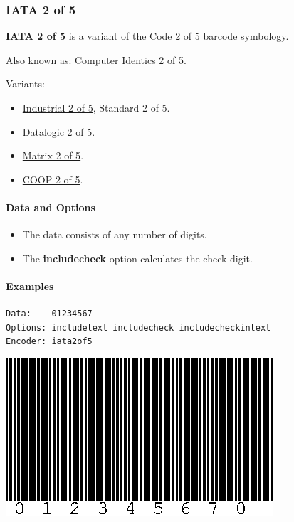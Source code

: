 \hypertarget{iata-2-of-5}{%
\subsubsection{IATA 2 of 5}\label{iata-2-of-5}}

\textbf{IATA 2 of 5} is a variant of the
\protect\hyperlink{code-25}{Code 2 of 5} barcode symbology.

Also known as: Computer Identics 2 of 5.

Variants:

\begin{itemize}
\tightlist
\item
  \protect\hyperlink{code-25}{Industrial 2 of 5}, Standard 2 of 5.
\item
  \protect\hyperlink{datalogic-2-of-5}{Datalogic 2 of 5}.
\item
  \protect\hyperlink{matrix-2-of-5}{Matrix 2 of 5}.
\item
  \protect\hyperlink{coop-2-of-5}{COOP 2 of 5}.
\end{itemize}

\hypertarget{data-and-options-68}{%
\paragraph{Data and Options}\label{data-and-options-68}}

\begin{itemize}
\tightlist
\item
  The data consists of any number of digits.
\item
  The \textbf{includecheck} option calculates the check digit.
\end{itemize}

\hypertarget{examples-45}{%
\paragraph{Examples}\label{examples-45}}

\begin{verbatim}
Data:    01234567
Options: includetext includecheck includecheckintext
Encoder: iata2of5
\end{verbatim}

\includegraphics{images/code25-2.eps}

